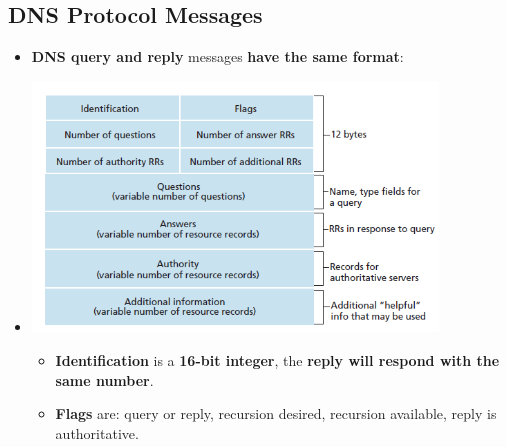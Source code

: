 \documentclass[16pt]{article}
\begin{document}
    \subsection*{DNS Protocol Messages}
    \begin{itemize}
        \item \textbf{DNS query and reply} messages \textbf{have the same format}:
        \item[] \includegraphics[width=407px]{images/DNS-Message.png}
        \begin{itemize}
            \item \textbf{Identification} is a \textbf{16-bit integer}, the \textbf{reply will respond with the same number}.
            \item \textbf{Flags} are: query or reply, recursion desired, recursion available, reply is authoritative.
        \end{itemize}        
    \end{itemize}
\end{document}
